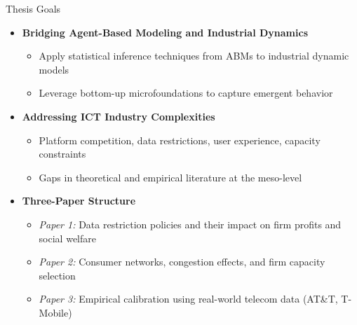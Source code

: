 \documentclass[10pt,aspectratio=169]{beamer}
\begin{document}
\begin{frame}{Thesis Goals}
\begin{itemize}
    \item \textbf{Bridging Agent-Based Modeling and Industrial Dynamics}
    \begin{itemize}
        \item[-] Apply statistical inference techniques from ABMs to industrial dynamic models
        \item[-] Leverage bottom-up microfoundations to capture emergent behavior
    \end{itemize}
    
    \vspace{2mm}
    \item \textbf{Addressing ICT Industry Complexities}
    \begin{itemize}
        \item[-] Platform competition, data restrictions, user experience, capacity constraints
        \item[-] Gaps in theoretical and empirical literature at the meso-level
    \end{itemize}
    
    \vspace{2mm}
    \item \textbf{Three-Paper Structure}
    \begin{itemize}
        \item[-] \textit{Paper 1:} Data restriction policies and their impact on firm profits and social welfare
        \item[-] \textit{Paper 2:} Consumer networks, congestion effects, and firm capacity selection
        \item[-] \textit{Paper 3:} Empirical calibration using real-world telecom data (AT\&T, T-Mobile)
    \end{itemize}
\end{itemize}
\end{frame}
\end{document}
